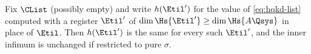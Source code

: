 
\begin{lemma}\label{lem:purifier-indep}
Fix $\CList$ (possibly empty) and write $h(\Etil')$ for the value of
\eqref{eq:hqkd-list} computed with a register $\Etil'$ of
$\dim\Hs{\Etil'}\ge\dim\Hs{A\Qsys}$ in place of $\Etil$. Then
$h(\Etil')$ is the same for every such $\Etil'$, and the inner infimum
is unchanged if restricted to pure $\sigma$.
\end{lemma}

